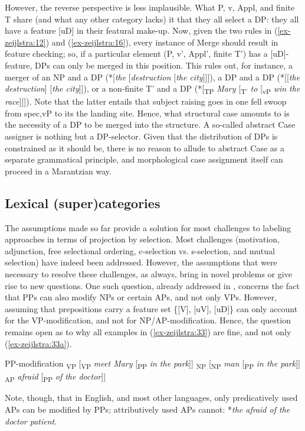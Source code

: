 \documentclass[output=paper
,modfonts
,nonflat]{langsci/langscibook}
\begin{document}
However, the reverse perspective is less implausible. What P, v, Appl, and finite T share (and what any other category lacks) it that they all select a DP: they all have a feature [uD] in their featural make-up. Now, given the two rules in (\ref{ex-zeijlstra:12}) and (\ref{ex-zeijlstra:16}), every instance of Merge should result in feature checking; so, if a particular element (P, v’, Appl’, finite T’) has a [uD]-feature, DPs can only be merged in this position. This rules out, for instance, a merger of an NP and a DP (*[\textit{the} [\textit{destruction} [\textit{the city}]]]), a DP and a DP (*[[\textit{the destruction}] [\textit{the city}]]), or a non-finite T’ and a DP (*[\textsubscript{TP} \textit{Mary} [\textsubscript{T’} \textit{to} [\textsubscript{vP} \textit{win the race}]]]). Note that the latter entails that subject raising goes in one fell swoop from spec,vP to its the landing site. Hence, what structural case amounts to is the necessity of a DP to be merged into the structure. A so-called abstract Case assigner is nothing but a DP-selector. Given that the distribution of DPs is constrained as it should be, there is no reason to allude to abstract Case as a separate grammatical principle, and morphological case assignment itself can proceed in a Marantzian way.

\subsection{Lexical (super)categories} \label{sec-zeijlstra:3.7}
The assumptions made so far provide a solution for most challenges to labeling approaches in terms of projection by selection. Most challenges (motivation, adjunction, free selectional ordering, c-selection vs. s-selection, and mutual selection) have indeed been addressed. However, the assumptions that were necessary to resolve these challenges, as always, bring in novel problems or give rise to new questions. One such question, already addressed in , concerns the fact that PPs can also modify NPs or certain APs, and not only VPs. However, assuming that prepositions carry a feature set \{[V], [uV], [uD]\} can only account for the VP-modification, and not for NP/AP-modification. Hence, the question remains open as to why all examples in (\ref{ex-zeijlstra:33}) are fine, and not only (\ref{ex-zeijlstra:33a}). 

\begin{exe}
\ex PP-modification \label{ex-zeijlstra:33}
	\xlist
	\ex {[}\textsubscript{VP} [\textsubscript{VP} \textit{meet Mary} [\textsubscript{PP} \textit{in the park}]{]} \label{ex-zeijlstra:33a}
	\ex {[}\textsubscript{NP} [\textsubscript{NP} \textit{man} [\textsubscript{PP} \textit{in the park}]{]}
	\ex {[}\textsubscript{AP} \textit{afraid} [\textsubscript{PP} \textit{of the doctor}]{]}
	\endxlist
\end{exe}
Note, though, that in English, and most other languages, only predicatively used APs can be modified by PPs; attributively used APs cannot: *\textit{the afraid of the doctor patient}.
\end{document}
